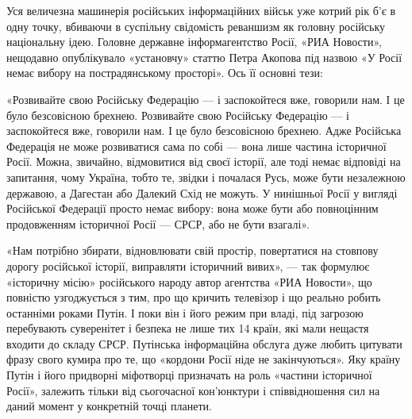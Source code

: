 Уся величезна машинерія російських інформаційних військ уже котрий рік б’є в
одну точку, вбиваючи в суспільну свідомість реваншизм як головну російську
національну ідею. Головне державне інформагентство Росії, «РИА Новости»,
нещодавно опублікувало «установчу» статтю Петра Акопова під назвою «У Росії
немає вибору на пострадянському просторі».  Ось її основні тези:

«Розвивайте свою Російську Федерацію — і заспокойтеся вже, говорили нам.  І це
було безсовісною брехнею.  Розвивайте свою Російську Федерацію — і заспокойтеся
вже, говорили нам.  І це було безсовісною брехнею.  Адже Російська Федерація не
може розвиватися сама по собі — вона лише частина історичної Росії.  Можна,
звичайно, відмовитися від своєї історії, але тоді немає відповіді на запитання,
чому Україна, тобто те, звідки і почалася Русь, може бути незалежною державою,
а Дагестан або Далекий Схід не можуть. У нинішньої Росії у вигляді Російської
Федерації просто немає вибору: вона може бути або повноцінним продовженням
історичної Росії — СРСР, або не бути взагалі».

«Нам потрібно збирати, відновлювати свій простір, повертатися на стовпову
дорогу російської історії, виправляти історичний вивих», — так формулює
«історичну місію» російського народу автор агентства «РИА Новости», що повністю
узгоджується з тим, про що кричить телевізор і що реально робить останніми
роками Путін. І поки він і його режим при владі, під загрозою перебувають
суверенітет і безпека не лише тих 14 країн, які мали нещастя входити до складу
СРСР.  Путінська інформаційна обслуга дуже любить цитувати фразу свого кумира
про те, що «кордони Росії ніде не закінчуються». Яку країну Путін і його
придворні міфотворці призначать на роль «частини історичної Росії», залежить
тільки від сьогочасної кон’юнктури і співвідношення сил на даний момент у
конкретній точці планети.
